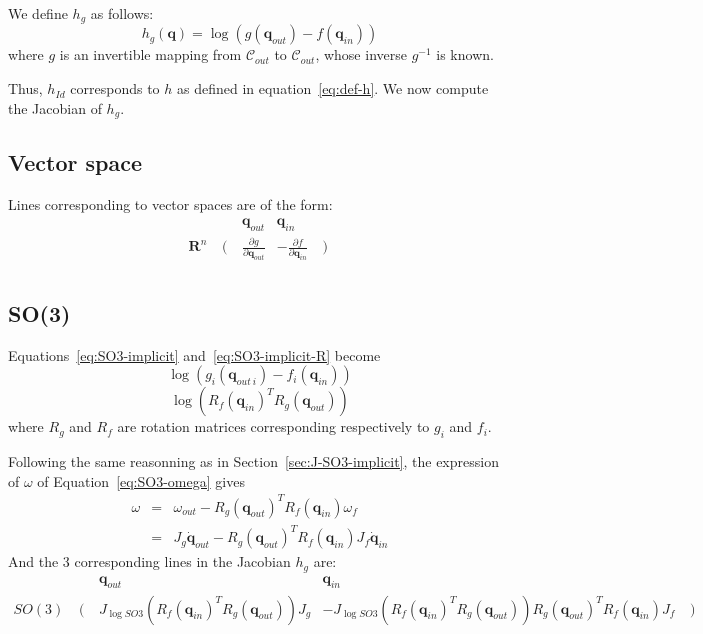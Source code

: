 \documentclass {article}
\newcommand\reals{\mathbf{R}}
\newcommand\CS{\mathcal{C}}
\newcommand\conf{\mathbf{q}}
\newcommand\JlogSO[1]{J_{\log SO#1}}
\begin{document}
We define $h_{g}$ as follows:
\begin {equation}\label{eq:def-hg}
h_g (\conf) = \log (g (\conf_{out}) - f (\conf_{in}))
\end {equation}
where $g$ is an invertible mapping from $\CS_{out}$ to $\CS_{out}$, whose inverse $g^{-1}$ is known.

Thus, $h_{Id}$ corresponds to $h$ as defined in equation~\ref{eq:def-h}.
We now compute the Jacobian of $h_g$.

\subsection {Vector space}

Lines corresponding to vector spaces are of the form:
$$
\begin{array}{ccccc}
&&\conf_{out}& \conf_{in} \\
\reals^n & \left(\right. & \frac{\partial g}{\partial\conf_{out}} & -\frac{\partial f}{\partial\conf_{in}} & \left.\right)\\
\end{array}
$$

\subsection {SO(3)}

Equations~\eqref{eq:SO3-implicit} and~\eqref{eq:SO3-implicit-R} become
\begin{equation}\label{eq:g-SO3-implicit}
\log (g_i(\conf_{out\ i}) - f_{i}(\conf_{in}))
\end{equation}
\begin{equation}\label{eq:g-SO3-implicit-R}
  \log (R_{f}(\conf_{in})^T R_{g}(\conf_{out}))
\end{equation}
where $R_{g}$ and $R_{f}$ are rotation matrices corresponding respectively to $g_i$ and $f_{i}$.

Following the same reasonning as in Section~\ref{sec:J-SO3-implicit}, the expression of $\omega$ of Equation~\eqref{eq:SO3-omega} gives
\begin{eqnarray*}
\omega &=& \omega_{out} - R_g (\conf_{out})^TR_{f}(\conf_{in})\omega_{f} \\
&=& J_g\dot{\conf}_{out} - R_g (\conf_{out})^TR_{f}(\conf_{in}) J_f\dot{\conf}_{in}
\end{eqnarray*}
And the 3 corresponding lines in the Jacobian $h_g$ are:
$$
\begin{array}{ccccc}
&&\conf_{out}& \conf_{in} \\
SO(3) & \left(\right.
&  \JlogSO{3}\left(R_{f}(\conf_{in})^T R_g (\conf_{out})\right) J_g
& -\JlogSO{3}\left(R_{f}(\conf_{in})^T R_g (\conf_{out})\right)R_g (\conf_{out})^TR_{f}(\conf_{in})J_{f} & \left.\right)\\
\end{array}
$$
\end{document}
